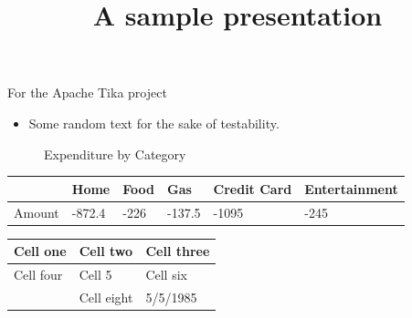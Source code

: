 \documentclass[11pt,a4paper]{article}
\title{A sample presentation}
\begin{document}
\maketitle

For the Apache Tika project

\begin{itemize}
\item Some random text for the sake of testability.
\end{itemize}

\begin{figure}[h]
\caption{Expenditure by Category}
\end{figure}

\begin{table}[h]
\begin{tabular}{|l|l|l|l|l|l|}
\hline
 & Home & Food & Gas & Credit Card & Entertainment \\ \hline
Amount & -872.4 & -226 & -137.5 & -1095 & -245 \\ \hline
\end{tabular}
\end{table}

\begin{table}[h]
\begin{tabular}{|l|l|l|}
\hline
Cell one & Cell two & Cell three \\ \hline
Cell four & Cell 5 & Cell six \\ \hline
 & Cell eight & 5/5/1985 \\ \hline
\end{tabular}
\end{table}
\end{document}
